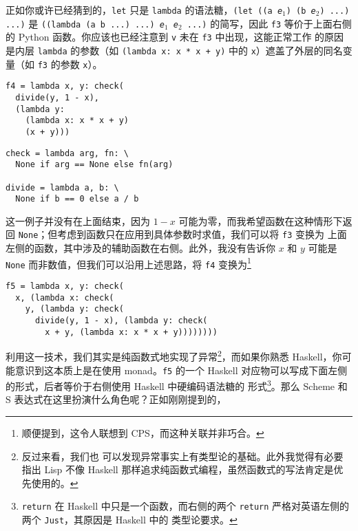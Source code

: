 正如你或许已经猜到的，\verb|let| 只是 \verb|lambda| 的语法糖，\texttt{(let
((a \emph{e$_1$}) (b \emph{e$_2$}) ...) ...)} 是 \texttt{((lambda (a b ...)
...) \emph{e$_1$} \emph{e$_2$} ...)} 的简写，因此 \verb|f3| 等价于上面右侧的
Python 函数。你应该也已经注意到 \verb|v| 未在 \verb|f3| 中出现，这能正常工作
的原因是内层 \verb|lambda| 的参数（如 \texttt{(lambda x: x * x + y)} 中的
\verb|x|）遮盖了外层的同名变量（如 \verb|f3| 的参数 \verb|x|）。

\colskipa\begin{multicols}{2}
\begin{quoting}
\begin{Verbatim}
f4 = lambda x, y: check(
  divide(y, 1 - x),
  (lambda y:
    (lambda x: x * x + y)
    (x + y)))
\end{Verbatim}
\end{quoting}
\begin{quoting}
\begin{Verbatim}
check = lambda arg, fn: \
  None if arg == None else fn(arg)

divide = lambda a, b: \
  None if b == 0 else a / b
\end{Verbatim}
\end{quoting}
\end{multicols}\colskipb
这一例子并没有在上面结束，因为 $1 - x$ 可能为零，而我希望函数在这种情形下返回
\verb|None|；但考虑到函数只在应用到具体参数时求值，我们可以将 \verb|f3| 变换为
上面左侧的函数，其中涉及的辅助函数在右侧。此外，我没有告诉你 $x$ 和 $y$ 可能是
\verb|None| 而非数值，但我们可以沿用上述思路，将 \verb|f4| 变换为\footnote%
{顺便提到，这令人联想到 CPS，而这种关联并非巧合。}
\begin{quoting}
\begin{Verbatim}
f5 = lambda x, y: check(
  x, (lambda x: check(
    y, (lambda y: check(
      divide(y, 1 - x), (lambda y: check(
        x + y, (lambda x: x * x + y))))))))
\end{Verbatim}
\end{quoting}
利用这一技术，我们其实是纯函数式地实现了异常\footnote{反过来看，我们也
可以发现异常事实上有类型论的基础。此外我觉得有必要指出 Lisp 不像 Haskell
那样追求纯函数式编程，虽然函数式的写法肯定是优先使用的。}，而如果你熟悉
Haskell，你可能意识到这本质上是在使用 monad。\verb|f5| 的一个 Haskell
对应物可以写成下面左侧的形式，后者等价于右侧使用 Haskell 中硬编码语法糖的
形式\footnote{\texttt{return} 在 Haskell 中只是一个函数，而右侧的两个
\texttt{return} 严格对英语左侧的两个 \texttt{Just}，其原因是 Haskell 中的
类型论要求。}。那么 Scheme 和 S 表达式在这里扮演什么角色呢？正如刚刚提到的，
